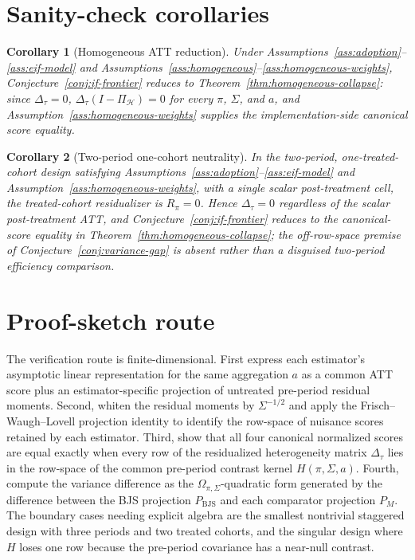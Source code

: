 \documentclass[11pt]{article}
\newcommand{\calH}{\mathcal{H}}
\theoremstyle{definition}
\theoremstyle{plain}
\newtheorem{corollary}{Corollary}
\theoremstyle{remark}
\begin{document}
\section{Sanity-check corollaries}
\begin{corollary}[Homogeneous ATT reduction]\label{cor:homogeneous}
Under Assumptions~\ref{ass:adoption}--\ref{ass:eif-model} and
Assumptions~\ref{ass:homogeneous}--\ref{ass:homogeneous-weights},
Conjecture~\ref{conj:if-frontier} reduces to
Theorem~\ref{thm:homogeneous-collapse}: since \(\Delta_\tau=0\),
\(\Delta_\tau(I-\Pi_{\calH})=0\) for every \(\pi\), \(\Sigma\), and \(a\), and
Assumption~\ref{ass:homogeneous-weights} supplies the implementation-side
canonical score equality.
\end{corollary}

\begin{corollary}[Two-period one-cohort neutrality]\label{cor:two-period}
In the two-period, one-treated-cohort design satisfying
Assumptions~\ref{ass:adoption}--\ref{ass:eif-model} and
Assumption~\ref{ass:homogeneous-weights}, with a single scalar post-treatment
cell, the treated-cohort residualizer is \(R_\pi=0\).  Hence
\(\Delta_\tau=0\) regardless of the scalar post-treatment ATT, and
Conjecture~\ref{conj:if-frontier} reduces to the canonical-score equality in
Theorem~\ref{thm:homogeneous-collapse}; the off-row-space premise of
Conjecture~\ref{conj:variance-gap} is absent rather than a disguised two-period
efficiency comparison.
\end{corollary}

\section{Proof-sketch route}
The verification route is finite-dimensional.  First express each estimator's
asymptotic linear representation for the same aggregation \(a\) as a common
ATT score plus an estimator-specific projection of untreated pre-period
residual moments.  Second, whiten the residual moments by \(\Sigma^{-1/2}\) and
apply the Frisch--Waugh--Lovell projection identity to identify the row-space
of nuisance scores retained by each estimator.  Third, show that all four
canonical normalized scores are equal exactly when every row of the residualized
heterogeneity matrix \(\Delta_\tau\) lies in the row-space of the common
pre-period contrast kernel \(H(\pi,\Sigma,a)\).  Fourth, compute the variance difference as the
\(\Omega_{\pi,\Sigma}\)-quadratic form generated by the difference between the
BJS projection \(P_{\mathrm{BJS}}\) and each comparator projection \(P_M\).  The
boundary cases needing explicit algebra are the smallest nontrivial staggered
design with three periods and two treated cohorts, and the singular design
where \(H\) loses one row because the pre-period covariance has a near-null
contrast.
\end{document}
